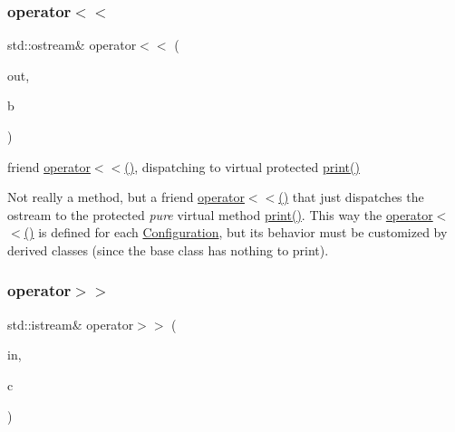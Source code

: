 \subsubsection{\texorpdfstring{operator$<$$<$}{operator<<}}
{\footnotesize\ttfamily std\+::ostream\& operator$<$$<$ (\begin{DoxyParamCaption}\item[{std\+::ostream \&}]{out,  }\item[{const \mbox{\hyperlink{class_s_m_spp__di__unipi__it_1_1_configuration}{Configuration}} \&}]{b }\end{DoxyParamCaption})\hspace{0.3cm}{\ttfamily [friend]}}



friend \mbox{\hyperlink{class_s_m_spp__di__unipi__it_1_1_configuration_ad9926988904739fe7789505dc5292685}{operator$<$$<$()}}, dispatching to virtual protected \mbox{\hyperlink{class_s_m_spp__di__unipi__it_1_1_configuration_a2e7b9c9148a98c5c342e8c25cac95926}{print()}} 

Not really a method, but a friend \mbox{\hyperlink{class_s_m_spp__di__unipi__it_1_1_configuration_ad9926988904739fe7789505dc5292685}{operator$<$$<$()}} that just dispatches the ostream to the protected {\itshape pure} virtual method \mbox{\hyperlink{class_s_m_spp__di__unipi__it_1_1_configuration_a2e7b9c9148a98c5c342e8c25cac95926}{print()}}. This way the \mbox{\hyperlink{class_s_m_spp__di__unipi__it_1_1_configuration_ad9926988904739fe7789505dc5292685}{operator$<$$<$()}} is defined for each \mbox{\hyperlink{class_s_m_spp__di__unipi__it_1_1_configuration}{Configuration}}, but its behavior must be customized by derived classes (since the base class has nothing to print). \mbox{\label{class_s_m_spp__di__unipi__it_1_1_configuration_a670faf8496c014b1c605559fca07429b}} 
\subsubsection{\texorpdfstring{operator$>$$>$}{operator>>}}
{\footnotesize\ttfamily std\+::istream\& operator$>$$>$ (\begin{DoxyParamCaption}\item[{std\+::istream \&}]{in,  }\item[{\mbox{\hyperlink{class_s_m_spp__di__unipi__it_1_1_configuration}{Configuration}} \&}]{c }\end{DoxyParamCaption})\hspace{0.3cm}{\ttfamily [friend]}}



